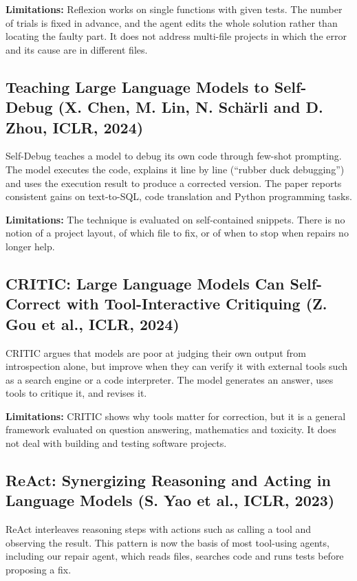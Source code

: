 \documentclass[12pt,a4paper]{report}
\begin{document}
\textbf{Limitations:} Reflexion works on single functions with given tests. The number of trials is fixed in advance, and the agent edits the whole solution rather than locating the faulty part. It does not address multi-file projects in which the error and its cause are in different files.

\subsection{Teaching Large Language Models to Self-Debug (X. Chen, M. Lin, N. Sch{\"a}rli and D. Zhou, ICLR, 2024)}

Self-Debug \cite{chen2024selfdebug} teaches a model to debug its own code through few-shot prompting. The model executes the code, explains it line by line (``rubber duck debugging'') and uses the execution result to produce a corrected version. The paper reports consistent gains on text-to-SQL, code translation and Python programming tasks.

\textbf{Limitations:} The technique is evaluated on self-contained snippets. There is no notion of a project layout, of which file to fix, or of when to stop when repairs no longer help.

\subsection{CRITIC: Large Language Models Can Self-Correct with Tool-Interactive Critiquing (Z. Gou et al., ICLR, 2024)}

CRITIC \cite{gou2024critic} argues that models are poor at judging their own output from introspection alone, but improve when they can verify it with external tools such as a search engine or a code interpreter. The model generates an answer, uses tools to critique it, and revises it.

\textbf{Limitations:} CRITIC shows why tools matter for correction, but it is a general framework evaluated on question answering, mathematics and toxicity. It does not deal with building and testing software projects.

\subsection{ReAct: Synergizing Reasoning and Acting in Language Models (S. Yao et al., ICLR, 2023)}

ReAct \cite{yao2023react} interleaves reasoning steps with actions such as calling a tool and observing the result. This pattern is now the basis of most tool-using agents, including our repair agent, which reads files, searches code and runs tests before proposing a fix.
\end{document}
